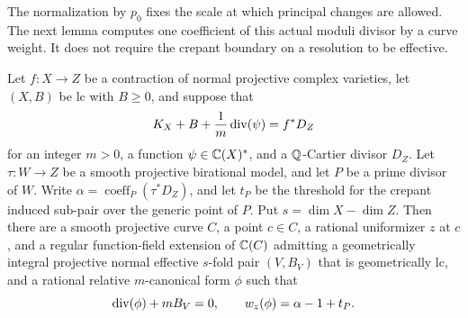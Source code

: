 The normalization by $p_0$ fixes the scale at which principal changes
are allowed.  The next lemma computes one coefficient of this actual
moduli divisor by a curve weight.  It does not require the crepant
boundary on a resolution to be effective.

\begin{lemma}\label{lem:slice}
Let $f:X\to Z$ be a contraction of normal projective complex varieties,
let $(X,B)$ be lc with $B\geq0$, and suppose that
\[
 K_X+B+\frac1m\operatorname{div}(\psi)=f^*D_Z
\]
for an integer $m>0$, a function $\psi\in\mathbb C(X)^*$, and a
$\mathbb Q$-Cartier divisor $D_Z$.
Let $\tau:W\to Z$ be a smooth projective birational model, and let
$P$ be a prime divisor of $W$.  Write
$\alpha=\operatorname{coeff}_P(\tau^*D_Z)$, and let $t_P$ be the
threshold for the crepant induced sub-pair over the generic point of
$P$.  Put $s=\dim X-\dim Z$.
Then there are a smooth projective curve $C$, a point $c\in C$, a
rational uniformizer $z$ at $c$, and a regular function-field extension
of $\mathbb C(C)$ admitting a geometrically integral projective normal
effective $s$-fold pair $(V,B_V)$ that is geometrically lc, and a
rational relative $m$-canonical form $\phi$ such that
\begin{equation}\label{eq:slice-weight}
 \operatorname{div}(\phi)+mB_V=0,\qquad w_z(\phi)=\alpha-1+t_P.
\end{equation}
\end{lemma}

